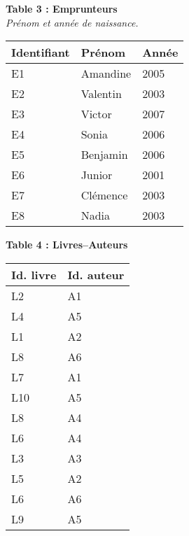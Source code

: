 \documentclass[class=report,crop=false, 12pt]{standalone}
\begin{document}
\vspace*{-3ex}

{\footnotesize
\begin{center}
\begin{minipage}{0.4\textwidth}

\textbf{Table 3 : Emprunteurs}\\
\emph{Prénom et année de naissance.} \\

\begin{tabular}{|l|l|l|} \hline
\textbf{Identifiant} & \textbf{Prénom} & \textbf{Année} \\ \hline\hline
E1 & Amandine & 2005 \\ \hline
E2 & Valentin & 2003 \\ \hline
E3 & Victor & 2007 \\ \hline
E4 & Sonia & 2006 \\ \hline
E5 & Benjamin & 2006 \\ \hline
E6 & Junior & 2001 \\ \hline
E7 & Clémence &  2003 \\ \hline
E8 & Nadia & 2003 \\ \hline
\end{tabular}
\end{minipage}
%
%
\begin{minipage}{0.29\textwidth}

\textbf{Table 4 : Livres--Auteurs}\\

\begin{tabular}{|l|l|} \hline
\textbf{Id. livre} & \textbf{Id. auteur}  \\ \hline\hline
L2 & A1 \\ \hline
L4 & A5\\ \hline
L1 & A2 \\ \hline
L8 & A6 \\ \hline
L7 & A1 \\ \hline
L10 & A5 \\ \hline
L8 & A4 \\ \hline
L6 & A4 \\ \hline
L3 & A3 \\ \hline
L5 & A2 \\ \hline
L6 & A6 \\ \hline
L9 & A5 \\ \hline 
\end{tabular}
\end{minipage}
%
%
\begin{minipage}{0.3\textwidth}


\end{minipage}
\end{center}}
\end{document}

